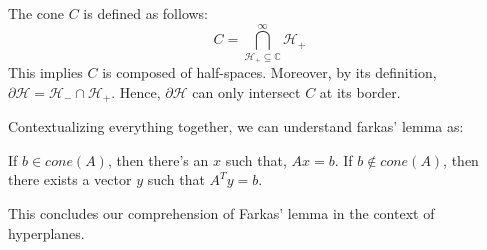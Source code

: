 \documentclass[11pt]{amsart} %
\theoremstyle{definition}
\begin{document}
The cone \(C\) is defined as follows:
\[
C = \bigcap_{\mathcal{H}_+ \subseteq \mathbb{C}}^\infty \mathcal{H}_+
\]
This implies \(C\) is composed of half-spaces. Moreover, by its definition, \(\partial \mathcal{H} = \mathcal{H}_- \cap \mathcal{H}_+\). Hence, \(\partial \mathcal{H}\) can only intersect \(C\) at its border.

Contextualizing everything together, we can understand farkas' lemma as:

\begin{center}
    If \(b \in cone(A)\), then there's an \(x\) such that, \( A x = b\). If \(b \notin cone(A)\), then there exists a vector \( y \) such that \( A^T y = b\).
\end{center}

This concludes our comprehension of Farkas' lemma in the context of hyperplanes.
\end{document}
